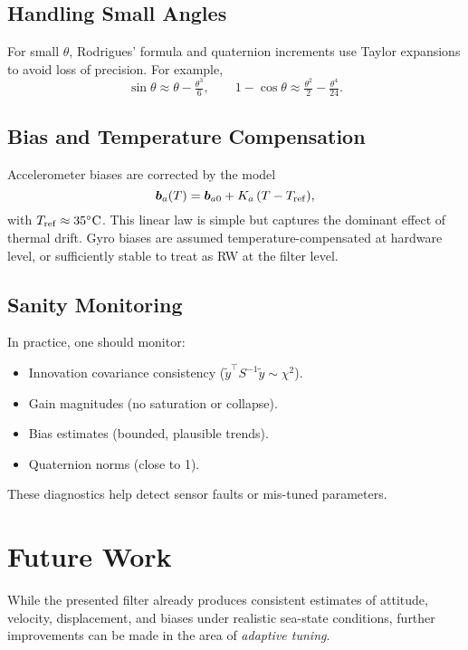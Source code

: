 \documentclass[10pt]{extarticle}
\begin{document}
\subsection{Handling Small Angles}
For small $\theta$, Rodrigues’ formula and quaternion increments use Taylor expansions to
avoid loss of precision. For example,
\[
\sin\theta \approx \theta - \tfrac{\theta^3}{6},\qquad
1-\cos\theta \approx \tfrac{\theta^2}{2} - \tfrac{\theta^4}{24}.
\]

\subsection{Bias and Temperature Compensation}
Accelerometer biases are corrected by the model
\[
\bm b_a(T) = \bm b_{a0} + K_a\,(T-T_{\rm ref}),
\]
with $T_{\rm ref}\approx 35^\circ{\rm C}$. This linear law is simple but captures the
dominant effect of thermal drift. Gyro biases are assumed temperature-compensated at
hardware level, or sufficiently stable to treat as RW at the filter level.

\subsection{Sanity Monitoring}
In practice, one should monitor:
\begin{itemize}
\item Innovation covariance consistency ($\tilde y^\top S^{-1}\tilde y \sim \chi^2$).
\item Gain magnitudes (no saturation or collapse).
\item Bias estimates (bounded, plausible trends).
\item Quaternion norms (close to 1).
\end{itemize}
These diagnostics help detect sensor faults or mis-tuned parameters.


\section{Future Work}
\label{sec:future-work}

While the presented filter already produces consistent estimates of attitude,
velocity, displacement, and biases under realistic sea-state conditions,
further improvements can be made in the area of \emph{adaptive tuning}.
\end{document}
